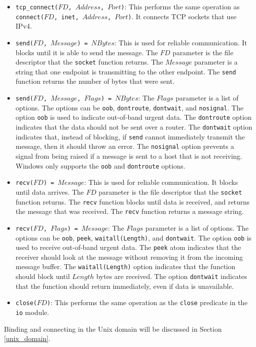 \begin{itemize}
\item \texttt{tcp\_connect($FD$, $Address$, $Port$)}: This performs the same operation as \texttt{connect($FD$, inet, $Address$, $Port$)}.  It connects TCP sockets that use IPv4.
\item \texttt{send($FD$, $Message$) = $NBytes$}: This is used for reliable communication.  It blocks until it is able to send the message.  The $FD$ parameter is the file descriptor that the \texttt{socket} function returns.  The $Message$ parameter is a string that one endpoint is transmitting to the other endpoint.  The \texttt{send} function returns the number of bytes that were sent.
\item \texttt{send($FD$, $Message$, $Flags$) = $NBytes$}: The $Flags$ parameter is a list of options. The options can be \texttt{oob}, \texttt{dontroute}, \texttt{dontwait}, and \texttt{nosignal}.  The option \texttt{oob} is used to indicate out-of-band urgent data.  The \texttt{dontroute} option indicates that the data should not be sent over a router.  The \texttt{dontwait} option indicates that, instead of blocking, if \texttt{send} cannot immediately transmit the message, then it should throw an error.  The \texttt{nosignal} option prevents a signal from being raised if a message is sent to a host that is not receiving.  Windows only supports the \texttt{oob} and \texttt{dontroute} options.
\item \texttt{recv($FD$) = $Message$}: This is used for reliable communication.  It blocks until data arrives.  The $FD$ parameter is the file descriptor that the \texttt{socket} function returns.  The \texttt{recv} function blocks until data is received, and returns the message that was received.  The \texttt{recv} function returns a message string.  
\item \texttt{recv($FD$, $Flags$) = $Message$}:  The $Flags$ parameter is a list of options.   The options can be \texttt{oob}, \texttt{peek}, \texttt{waitall(Length)}, and \texttt{dontwait}.  The option \texttt{oob} is used to receive out-of-band urgent data.  The \texttt{peek} atom indicates that the receiver should look at the message without removing it from the incoming message buffer.  The \texttt{waitall(Length)} option  indicates that the function should block until $Length$ bytes are received.  The option \texttt{dontwait} indicates that the function should return immediately, even if data is unavailable.
\item \texttt{close($FD$)}:  This performs the same operation as the \texttt{close} predicate in the \texttt{io} module.
\end{itemize}
Binding and connecting in the Unix domain will be discussed in Section \ref{unix_domain}.

